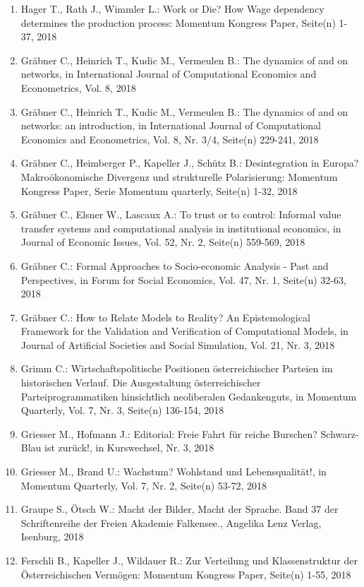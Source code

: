 \begin{enumerate}
	 \item Hager T., Rath J., Wimmler L.: Work or Die? How Wage dependency determines the production process: Momentum Kongress Paper, Seite(n) 1-37, 2018
	 \item Gräbner C., Heinrich T., Kudic M., Vermeulen B.: The dynamics of and on networks, in International Journal of Computational Economics and Econometrics, Vol. 8, 2018
	 \item Gräbner C., Heinrich T., Kudic M., Vermeulen B.: The dynamics of and on networks: an introduction, in International Journal of Computational Economics and Econometrics, Vol. 8, Nr. 3/4, Seite(n) 229-241, 2018
	 \item Gräbner C., Heimberger P., Kapeller J., Schütz B.: Desintegration in Europa? Makroökonomische Divergenz und strukturelle Polarisierung: Momentum Kongress Paper, Serie Momentum quarterly, Seite(n) 1-32, 2018
	 \item Gräbner C., Elsner W., Lascaux A.: To trust or to control: Informal value transfer systems and computational analysis in institutional economics, in Journal of Economic Issues, Vol. 52, Nr. 2, Seite(n) 559-569, 2018
	 \item Gräbner C.: Formal Approaches to Socio-economic Analysis - Past and Perspectives, in Forum for Social Economics, Vol. 47, Nr. 1, Seite(n) 32-63, 2018
	 \item Gräbner C.: How to Relate Models to Reality? An Epistemological Framework for the Validation and Verification of Computational Models, in Journal of Artificial Societies and Social Simulation, Vol. 21, Nr. 3, 2018
	 \item Grimm C.: Wirtschaftspolitische Positionen österreichischer Parteien im historischen Verlauf. Die Ausgestaltung österreichischer Parteiprogrammatiken hinsichtlich neoliberalen Gedankenguts, in Momentum Quarterly, Vol. 7, Nr. 3, Seite(n) 136-154, 2018
	 \item Griesser M., Hofmann J.: Editorial: Freie Fahrt für reiche Burschen? Schwarz-Blau ist zurück!, in Kurswechsel, Nr. 3, 2018
	 \item Griesser M., Brand U.: Wachstum? Wohlstand und Lebensqualität!, in Momentum Quarterly, Vol. 7, Nr. 2, Seite(n) 53-72, 2018
	 \item Graupe S., Ötsch W.: Macht der Bilder, Macht der Sprache. Band 37 der Schriftenreihe der Freien Akademie Falkensee., Angelika Lenz Verlag, Isenburg, 2018
	 \item Ferschli B., Kapeller J., Wildauer R.: Zur Verteilung und Klassenstruktur der Österreichischen Vermögen: Momentum Kongress Paper, Seite(n) 1-55, 2018

\end{enumerate}
